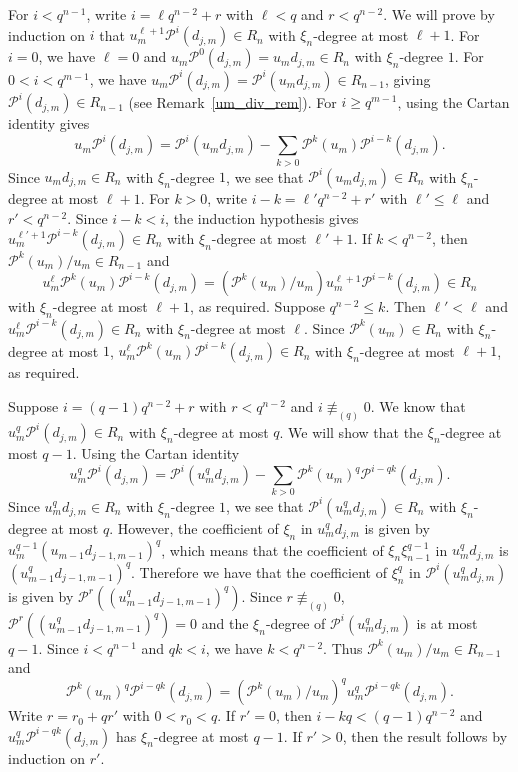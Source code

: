 \documentclass{amsart}
\newcommand{\PP}{\mathcal{P}}
\begin{document}
For $i<q^{n-1}$, write $i=\ell q^{n-2}+r$ with $\ell<q$ and $r<q^{n-2}$. 
We will prove by induction on $i$ that $u_m^{\ell+1}\PP^i(d_{j,m})\in R_{n}$ with $\xi_{n}$-degree at most $\ell+1$.
For $i=0$, we have $\ell=0$ and $u_m\PP^0(d_{j,m})=u_md_{j,m}\in R_{n}$ with $\xi_{n}$-degree $1$.
For $0<i<q^{m-1}$, we have $u_m\PP^i(d_{j,m})=\PP^i(u_m d_{j,m})\in R_{n-1}$, giving $\PP^i(d_{j,m})\in R_{n-1}$ (see Remark~\ref{um_div_rem}).
For $i\geq q^{m-1}$, using the Cartan identity gives
$$u_m\PP^i(d_{j,m})=\PP^i(u_m d_{j,m})-\sum_{k>0}\PP^k(u_m)\PP^{i-k}(d_{j,m}).$$
Since $u_m d_{j,m}\in R_{n}$ with $\xi_{n}$-degree $1$, we see that $\PP^i(u_m d_{j,m})\in R_{n}$ with $\xi_{n}$-degree at most $\ell+1$.
For $k>0$, write $i-k=\ell'q^{n-2}+r'$ with $\ell'\leq \ell$ and $r'<q^{n-2}$. Since $i-k<i$, the induction hypothesis gives
$u_m^{\ell'+1}\PP^{i-k}(d_{j,m})\in R_{n}$ with $\xi_{n}$-degree at most $\ell'+1$.
If $k<q^{n-2}$, then $\PP^k(u_m)/u_m\in R_{n-1}$ and 
$$u_m^{\ell}\PP^k(u_m)\PP^{i-k}(d_{j,m}) =(\PP^k(u_m)/u_m)u_m^{\ell+1}\PP^{i-k}(d_{j,m})\in R_{n}$$
with $\xi_{n}$-degree at most $\ell+1$, as required. Suppose $q^{n-2}\leq k$. Then $\ell'<\ell$ and 
$u_m^{\ell}\PP^{i-k}(d_{j,m})\in R_{n}$ with $\xi_{n}$-degree at most $\ell$.
Since $\PP^k(u_m)\in R_{n}$ with $\xi_{n}$-degree at most $1$,
$u_m^{\ell}\PP^k(u_m)\PP^{i-k}(d_{j,m}) \in R_{n}$ with $\xi_{n}$-degree at most $\ell+1$, as required.

Suppose $i=(q-1)q^{n-2}+r$ with $r<q^{n-2}$ and $i\not\equiv_{(q)}0$. 
We know that $u_m^q\PP^i(d_{j,m})\in R_{n}$ with $\xi_{n}$-degree at most $q$.
We will show that the $\xi_{n}$-degree at most $q-1$.
Using the Cartan identity
$$u_m^q\PP^i(d_{j,m})=\PP^i(u_m^qd_{j,m})-\sum_{k>0}\PP^k(u_m)^q\PP^{i-qk}(d_{j,m}).$$
Since $u_m^qd_{j,m}\in R_{n}$ with $\xi_{n}$-degree $1$, we see that $\PP^i(u_m^qd_{j,m})\in R_{n}$
with $\xi_{n}$-degree at most $q$. However, the coefficient of $\xi_{n}$ in $u_m^qd_{j,m}$
is given by $u_m^{q-1}(u_{m-1}d_{j-1,m-1})^q$, which means that the coefficient of $\xi_{n}\xi_{n-1}^{q-1}$ in  
 $u_m^qd_{j,m}$ is $(u_{m-1}^q d_{j-1,m-1})^q$. 
 Therefore we have that the coefficient of $\xi_{n}^q$ in $\PP^i(u_m^qd_{j,m})$
 is given by $\PP^r((u_{m-1}^q d_{j-1,m-1})^q)$. Since $r\not\equiv_{(q)} 0$, $\PP^r((u_{m-1}^q d_{j-1,m-1})^q)=0$
 and the $\xi_{n}$-degree of $\PP^i(u_m^qd_{j,m})$ is at most $q-1$. Since $i<q^{n-1}$ and $qk<i$, we have $k<q^{n-2}$.
 Thus $\PP^k(u_m)/u_m\in R_{n-1}$ and $$\PP^k(u_m)^q\PP^{i-qk}(d_{j,m})=(\PP^k(u_m)/u_m)^q u_m^q \PP^{i-qk}(d_{j,m}).$$
 Write $r=r_0+qr'$ with $0<r_0<q$. If $r'=0$, then $i-kq<(q-1)q^{n-2}$ and $u_m^q \PP^{i-qk}(d_{j,m})$ has $\xi_{n}$-degree at most $q-1$.
 If $r'>0$, then the result follows by induction on $r'$.
\end{document}
